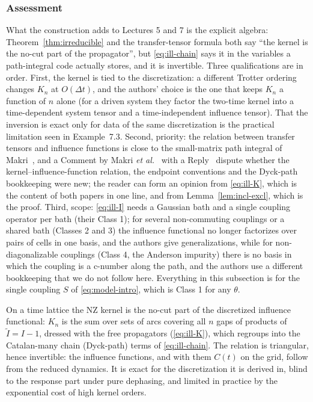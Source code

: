 \subsubsection{Assessment}

What the construction adds to Lectures 5 and 7 is the explicit algebra: Theorem~\ref{thm:irreducible} and the transfer-tensor formula both say ``the kernel is the no-cut part of the propagator'', but \cref{eq:ill-chain} says it in the variables a path-integral code actually stores, and it is invertible.
Three qualifications are in order.
First, the kernel is tied to the discretization: a different Trotter ordering changes $K_n$ at $O(\Delta t)$, and the authors' choice is the one that keeps $K_n$ a function of $n$ alone (for a driven system they factor the two-time kernel into a time-dependent system tensor and a time-independent influence tensor).
That the inversion is exact only for data of the same discretization is the practical limitation seen in Example~7.3.
Second, priority: the relation between transfer tensors and influence functions is close to the small-matrix path integral of Makri~\cite{Makri2020}, and a Comment by Makri \emph{et al.}~\cite{MakriComment2024} with a Reply~\cite{IvanderReply2024} dispute whether the kernel--influence-function relation, the endpoint conventions and the Dyck-path bookkeeping were new; the reader can form an opinion from \cref{eq:ill-K}, which is the content of both papers in one line, and from Lemma~\ref{lem:incl-excl}, which is the proof.
Third, scope: \cref{eq:ill-I} needs a Gaussian bath and a single coupling operator per bath (their Class 1); for several non-commuting couplings or a shared bath (Classes 2 and 3) the influence functional no longer factorizes over pairs of cells in one basis, and the authors give generalizations, while for non-diagonalizable couplings (Class 4, the Anderson impurity) there is no basis in which the coupling is a c-number along the path, and the authors use a different bookkeeping that we do not follow here.
Everything in this subsection is for the single coupling $S$ of \cref{eq:model-intro}, which is Class 1 for any $\theta$.

\begin{keybox}
On a time lattice the NZ kernel is the no-cut part of the discretized influence functional: $K_n$ is the sum over sets of arcs covering all $n$ gaps of products of $\tilde I=I-1$, dressed with the free propagators (\cref{eq:ill-K}), which regroups into the Catalan-many chain (Dyck-path) terms of \cref{eq:ill-chain}.
The relation is triangular, hence invertible: the influence functions, and with them $C(t)$ on the grid, follow from the reduced dynamics.
It is exact for the discretization it is derived in, blind to the response part under pure dephasing, and limited in practice by the exponential cost of high kernel orders.
\end{keybox}

